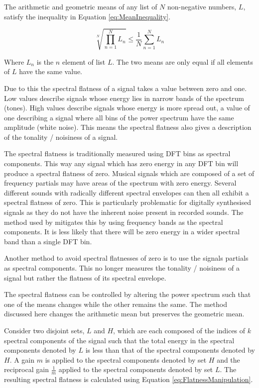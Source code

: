 		The arithmetic and geometric means of any list of $N$ non-negative numbers, $L$, satisfy the inequality in
		Equation \ref{eq:MeanInequality}.

		\begin{equation}
			\sqrt[N]{\prod_{n = 1}^{N} L_{n}} \leq \frac{1}{N} \sum_{n = 1}^{N} L_{n}
			\label{eq:MeanInequality}
		\end{equation}

		Where $L_{n}$ is the $n$ element of list $L$. The two means are only equal if all elements of $L$
		have the same value.

		Due to this the spectral flatness of a signal takes a value between zero and one. Low values describe
		signals whose energy lies in narrow bands of the spectrum (tones). High values describe signals whose
		energy is more spread out, a value of one describing a signal where all bins of the power spectrum have the
		same amplitude (white noise). This means the spectral flatness also gives a description of the tonality /
		noisiness of a signal.

		The spectral flatness is traditionally measured using DFT bins as spectral components. This way any signal
		which has zero energy in any DFT bin will produce a spectral flatness of zero. Musical signals which are
		composed of a set of frequency partials may have areas of the spectrum with zero energy. Several different
		sounds with radically different spectral envelopes can then all exhibit a spectral flatness of zero. This
		is particularly problematic for digitally synthesised signals as they do not have the inherent noise
		present in recorded sounds. The method used by \citet{peeters2004a} mitigates this by using frequency bands
		as the spectral components. It is less likely that there will be zero energy in a wider spectral band than
		a single DFT bin. 
		
		Another method to avoid spectral flatnesses of zero is to use the signals partials as spectral components.
		This no longer measures the tonality / noisiness of a signal but rather the flatness of its spectral
		envelope.

		The spectral flatness can be controlled by altering the power spectrum such that one of the means changes
		while the other remains the same. The method discussed here changes the arithmetic mean but preserves the
		geometric mean. 

		Consider two disjoint sets, $L$ and $H$, which are each composed of the indices of $k$ spectral components
		of the signal such that the total energy in the spectral components denoted by $L$ is less than that of the
		spectral components denoted by $H$. A gain $m$ is applied to the spectral components denoted by set $H$ and
		the reciprocal gain $\frac{1}{m}$ applied to the spectral components denoted by set $L$. The resulting
		spectral flatness is calculated using Equation \ref{eq:FlatnessManipulation}.


